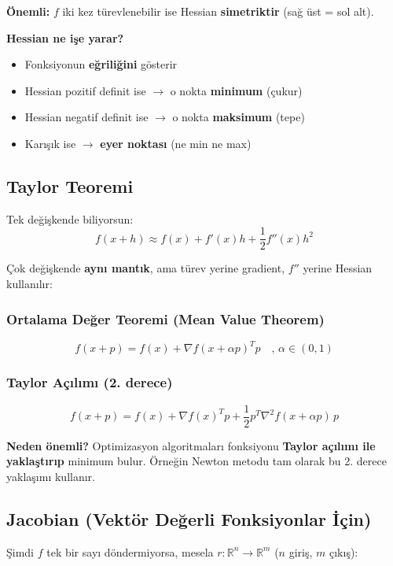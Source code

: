 \documentclass[12pt,a4paper]{article}
\theoremstyle{definition}
\theoremstyle{remark}
\begin{document}
\textbf{\"Onemli:} $f$ iki kez t\"urevlenebilir ise Hessian \textbf{simetriktir} (sa\u{g} \"ust = sol alt).

\textbf{Hessian ne i\c{s}e yarar?}
\begin{itemize}
    \item Fonksiyonun \textbf{e\u{g}rili\u{g}ini} g\"osterir
    \item Hessian pozitif definit ise $\to$ o nokta \textbf{minimum} (\c{c}ukur)
    \item Hessian negatif definit ise $\to$ o nokta \textbf{maksimum} (tepe)
    \item Kar{\i}\c{s}{\i}k ise $\to$ \textbf{eyer noktas{\i}} (ne min ne max)
\end{itemize}

\subsection{Taylor Teoremi}

Tek de\u{g}i\c{s}kende biliyorsun:
\[
f(x+h) \approx f(x) + f'(x)h + \frac{1}{2}f''(x)h^2
\]

\c{C}ok de\u{g}i\c{s}kende \textbf{ayn{\i} mant{\i}k}, ama t\"urev yerine gradient, $f''$ yerine Hessian kullan{\i}l{\i}r:

\subsubsection{Ortalama De\u{g}er Teoremi (Mean Value Theorem)}
\[
f(x+p) = f(x) + \nabla f(x + \alpha p)^T p \quad \text{, } \alpha \in (0,1)
\]

\subsubsection{Taylor A\c{c}{\i}l{\i}m{\i} (2. derece)}
\[
f(x+p) = f(x) + \nabla f(x)^T p + \frac{1}{2} p^T \nabla^2 f(x + \alpha p) \, p
\]

\textbf{Neden \"onemli?} Optimizasyon algoritmalar{\i} fonksiyonu \textbf{Taylor a\c{c}{\i}l{\i}m{\i} ile yakla\c{s}t{\i}r{\i}p} minimum bulur. \"Orne\u{g}in Newton metodu tam olarak bu 2. derece yakla\c{s}{\i}m{\i} kullan{\i}r.

\subsection{Jacobian (Vekt\"or De\u{g}erli Fonksiyonlar \.{I}\c{c}in)}

\c{S}imdi $f$ tek bir say{\i} d\"ondermiyorsa, mesela $r: \mathbb{R}^n \to \mathbb{R}^m$ ($n$ giri\c{s}, $m$ \c{c}{\i}k{\i}\c{s}):
\end{document}
